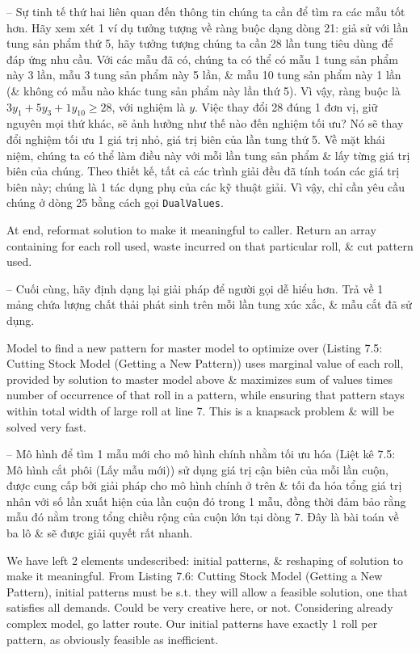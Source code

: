 \documentclass{article}
\begin{document}
\begin{itemize}
\begin{itemize}
\begin{itemize}
            -- Sự tinh tế thứ hai liên quan đến thông tin chúng ta cần để tìm ra các mẫu tốt hơn. Hãy xem xét 1 ví dụ tưởng tượng về ràng buộc dạng dòng 21: giả sử với lần tung sản phẩm thứ 5, hãy tưởng tượng chúng ta cần 28 lần tung tiêu dùng để đáp ứng nhu cầu. Với các mẫu đã có, chúng ta có thể có mẫu 1 tung sản phẩm này 3 lần, mẫu 3 tung sản phẩm này 5 lần, \& mẫu 10 tung sản phẩm này 1 lần (\& không có mẫu nào khác tung sản phẩm này lần thứ 5). Vì vậy, ràng buộc là $3y_1 + 5y_3 + 1y_{10}\ge28$, với nghiệm là $y$. Việc thay đổi 28 đúng 1 đơn vị, giữ nguyên mọi thứ khác, sẽ ảnh hưởng như thế nào đến nghiệm tối ưu? Nó sẽ thay đổi nghiệm tối ưu 1 giá trị nhỏ, giá trị biên của lần tung thứ 5. Về mặt khái niệm, chúng ta có thể làm điều này với mỗi lần tung sản phẩm \& lấy từng giá trị biên của chúng. Theo thiết kế, tất cả các trình giải đều đã tính toán các giá trị biên này; chúng là 1 tác dụng phụ của các kỹ thuật giải. Vì vậy, chỉ cần yêu cầu chúng ở dòng 25 bằng cách gọi {\tt DualValues}.

            At end, reformat solution to make it meaningful to caller. Return an array containing for each roll used, waste incurred on that particular roll, \& cut pattern used.

            -- Cuối cùng, hãy định dạng lại giải pháp để người gọi dễ hiểu hơn. Trả về 1 mảng chứa lượng chất thải phát sinh trên mỗi lần tung xúc xắc, \& mẫu cắt đã sử dụng.

            Model to find a new pattern for master model to optimize over ({\sf Listing 7.5: Cutting Stock Model (Getting a New Pattern)}) uses marginal value of each roll, provided by solution to master model above \& maximizes sum of values times number of occurrence of that roll in a pattern, while ensuring that pattern stays within total width of large roll at line 7. This is a knapsack problem \& will be solved very fast.

            -- Mô hình để tìm 1 mẫu mới cho mô hình chính nhằm tối ưu hóa ({\sf Liệt kê 7.5: Mô hình cắt phôi (Lấy mẫu mới)}) sử dụng giá trị cận biên của mỗi lần cuộn, được cung cấp bởi giải pháp cho mô hình chính ở trên \& tối đa hóa tổng giá trị nhân với số lần xuất hiện của lần cuộn đó trong 1 mẫu, đồng thời đảm bảo rằng mẫu đó nằm trong tổng chiều rộng của cuộn lớn tại dòng 7. Đây là bài toán về ba lô \& sẽ được giải quyết rất nhanh.

            We have left 2 elements undescribed: initial patterns, \& reshaping of solution to make it meaningful. From {\sf Listing 7.6: Cutting Stock Model (Getting a New Pattern)}, initial patterns must be s.t. they will allow a feasible solution, one that satisfies all demands. Could be very creative here, or not. Considering already complex model, go latter route. Our initial patterns have exactly 1 roll per pattern, as obviously feasible as inefficient.


\end{itemize}
\end{itemize}
\end{itemize}
\end{document}
